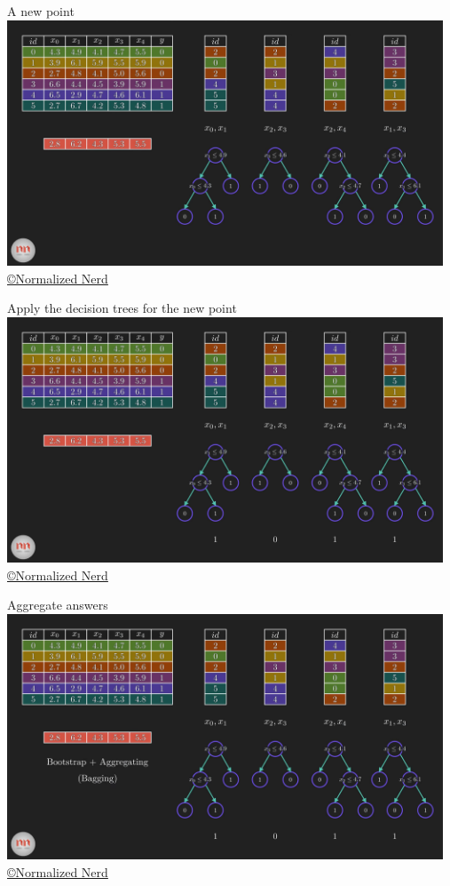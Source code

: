 \documentclass[handout, 10pt]{beamer}
\begin{document}
\begin{frame}{A new point}
\hspace*{-1cm}\includegraphics[width=13cm]{figs/rf/_4-57 screenshot.png}
{\tiny \href{https://www.youtube.com/watch?v=ZVR2Way4nwQ}{ \copyright Normalized Nerd}}
\end{frame}

\begin{frame}{Apply the decision trees for the new point}
\hspace*{-1cm}\includegraphics[width=13cm]{figs/rf/_5-23 screenshot.png}
{\tiny \href{https://www.youtube.com/watch?v=ZVR2Way4nwQ}{ \copyright Normalized Nerd}}
\end{frame}

\begin{frame}{Aggregate answers}
\hspace*{-1cm}\includegraphics[width=13cm]{figs/rf/_5-48 screenshot.png}
{\tiny \href{https://www.youtube.com/watch?v=ZVR2Way4nwQ}{ \copyright Normalized Nerd}}
\end{frame}
\end{document}
